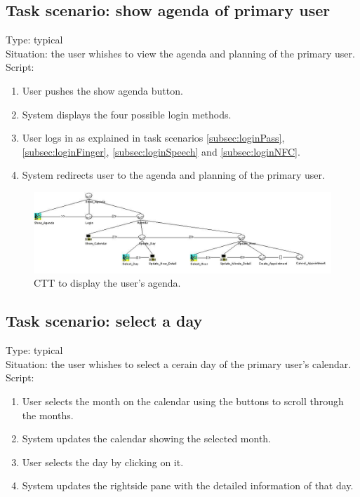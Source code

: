\documentclass[11pt, a4paper,svglistings]{report}
\begin{document}

\subsection{Task scenario: show agenda of primary user}

\label{subsec:agenda}Type: typical \\
Situation: the user whishes to view  the agenda and planning of the primary user. \\
Script:
\begin{enumerate}
\item User pushes the show agenda button.
\item System displays the four possible login methods.
\item User logs in as explained in task scenarios \ref{subsec:loginPass}, \ref{subsec:loginFinger}, \ref{subsec:loginSpeech} and \ref{subsec:loginNFC}.
\item System redirects user to the agenda and planning of the primary user.
\end{enumerate}

\begin{figure}[H]
\centering
    \includegraphics[width=1\textwidth]{ShowAgenda.jpg}
  \caption[Display agenda CTT]{\label{fig:ShowAgenda}CTT to display the user's agenda.}
\end{figure}


\subsection{Task scenario: select a day}

\label{subsec:day}Type: typical \\
Situation: the user whishes to select a cerain day  of the primary user's calendar. \\
Script:
\begin{enumerate}
\item User selects the month on the calendar using the buttons to scroll through the months.
\item System updates the calendar showing the selected month.
\item User selects the day by clicking on it.
\item System updates the rightside pane with the detailed information of that day.
\end{enumerate}
\end{document}
